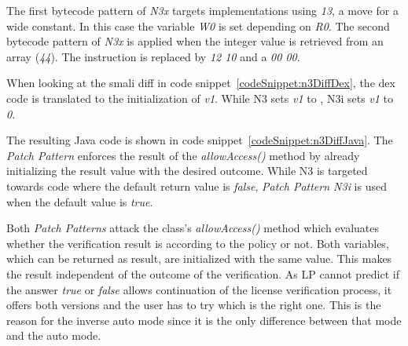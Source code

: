 The first bytecode pattern of \textit{N3x} targets implementations using \textit{13}, a move for a wide constant.
In this case the variable \textit{W0} is set depending on \textit{R0}.
The second bytecode pattern of \textit{N3x} is applied when the integer value is retrieved from an array (\textit{44}).
The instruction is replaced by \textit{12 10} and a \textit{00 00}.
\newline



When looking at the smali diff in code snippet~\ref{codeSnippet:n3DiffDex}, the dex code is translated to the initialization of \textit{v1}.
While N3 sets \textit{v1} to , N3i sets \textit{v1} to \textit{0}.
\newline

The resulting Java code is shown in code snippet~\ref{codeSnippet:n3DiffJava}.
The \textit{Patch Pattern} enforces the result of the \textit{allowAccess()} method by already initializing the result value with the desired outcome.
While N3 is targeted towards code where the default return value is \textit{false}, \textit{Patch Pattern N3i} is used when the default value is \textit{true}.
\newline

Both \textit{Patch Patterns} attack the class's \textit{allowAccess()} method which evaluates whether the verification result is according to the policy or not.
Both variables, which can be returned as result, are initialized with the same value.
This makes the result independent of the outcome of the verification.
As LP cannot predict if the answer \textit{true} or \textit{false} allows continuation of the license verification process, it offers both versions and the user has to try which is the right one.
This is the reason for the inverse auto mode since it is the only difference between that mode and the auto mode.

